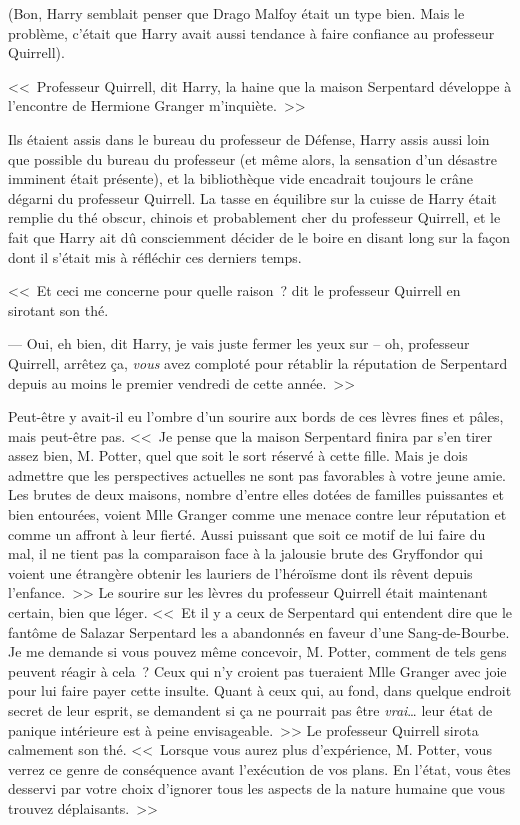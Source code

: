 (Bon, Harry semblait penser que Drago Malfoy était un type bien. Mais le problème, c'était que Harry avait aussi tendance à faire confiance au professeur Quirrell).

\later

<<~Professeur Quirrell, dit Harry, la haine que la maison Serpentard développe à l'encontre de Hermione Granger m'inquiète.~>>

Ils étaient assis dans le bureau du professeur de Défense, Harry assis aussi loin que possible du bureau du professeur (et même alors, la sensation d'un désastre imminent était présente), et la bibliothèque vide encadrait toujours le crâne dégarni du professeur Quirrell. La tasse en équilibre sur la cuisse de Harry était remplie du thé obscur, chinois et probablement cher du professeur Quirrell, et le fait que Harry ait dû consciemment décider de le boire en disant long sur la façon dont il s'était mis à réfléchir ces derniers temps.

<<~Et ceci me concerne pour quelle raison~? dit le professeur Quirrell en sirotant son thé.

--- Oui, eh bien, dit Harry, je vais juste fermer les yeux sur -- oh, professeur Quirrell, arrêtez ça, \emph{vous} avez comploté pour rétablir la réputation de Serpentard depuis au moins le premier vendredi de cette année.~>>

Peut-être y avait-il eu l'ombre d'un sourire aux bords de ces lèvres fines et pâles, mais peut-être pas. <<~Je pense que la maison Serpentard finira par s'en tirer assez bien, M. Potter, quel que soit le sort réservé à cette fille. Mais je dois admettre que les perspectives actuelles ne sont pas favorables à votre jeune amie. Les brutes de deux maisons, nombre d'entre elles dotées de familles puissantes et bien entourées, voient Mlle Granger comme une menace contre leur réputation et comme un affront à leur fierté. Aussi puissant que soit ce motif de lui faire du mal, il ne tient pas la comparaison face à la jalousie brute des Gryffondor qui voient une étrangère obtenir les lauriers de l'héroïsme dont ils rêvent depuis l'enfance.~>> Le sourire sur les lèvres du professeur Quirrell était maintenant certain, bien que léger. <<~Et il y a ceux de Serpentard qui entendent dire que le fantôme de Salazar Serpentard les a abandonnés en faveur d'une Sang-de-Bourbe. Je me demande si vous pouvez même concevoir, M. Potter, comment de tels gens peuvent réagir à cela~? Ceux qui n'y croient pas tueraient Mlle Granger avec joie pour lui faire payer cette insulte. Quant à ceux qui, au fond, dans quelque endroit secret de leur esprit, se demandent si ça ne pourrait pas être \emph{vrai}… leur état de panique intérieure est à peine envisageable.~>> Le professeur Quirrell sirota calmement son thé. <<~Lorsque vous aurez plus d'expérience, M. Potter, vous verrez ce genre de conséquence avant l'exécution de vos plans. En l'état, vous êtes desservi par votre choix d'ignorer tous les aspects de la nature humaine que vous trouvez déplaisants.~>>

